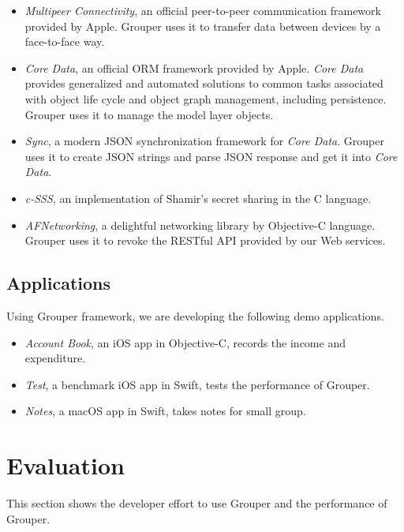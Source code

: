 \documentclass[twocolumn,10pt]{article}
\begin{document}
\begin{itemize}
	\setlength{\itemsep}{1pt}
	\setlength{\parskip}{0pt}
	\setlength{\parsep}{0pt}
	\item \emph{Multipeer Connectivity}\cite{mc},  an official peer-to-peer communication framework provided by Apple. Grouper uses it to transfer data between devices by a face-to-face way.
	\item \emph{Core Data}\cite{coredata}, an official ORM framework provided by Apple. \emph{Core Data} provides generalized and automated solutions to common tasks associated with object life cycle and object graph management, including persistence. Grouper uses it to manage the model layer objects. 
	\item \emph{Sync}\cite{sync}, a modern JSON synchronization framework for \emph{Core Data}. Grouper uses it to create JSON strings and parse JSON response and get it into \emph{Core Data}.
	\item \emph{c-SSS}\cite{c-sss}, an implementation of Shamir's secret sharing in the C language.
	\item \emph{AFNetworking}\cite{afnetworking}, a delightful networking library by Objective-C language. Grouper uses it to revoke the RESTful API provided by our Web services. 
\end{itemize}

\subsection{Applications}

Using Grouper framework, we are developing the following demo applications. 

\begin{itemize}
	\setlength{\itemsep}{1pt}
	\setlength{\parskip}{0pt}
	\setlength{\parsep}{0pt}
	\item \emph{Account Book}, an iOS app in Objective-C, records the income and expenditure.
	\item \emph{Test}, a benchmark iOS app in Swift, tests the performance of Grouper.
	\item \emph{Notes}, a macOS app in Swift, takes notes for small group.
\end{itemize}

\section{Evaluation}

This section shows the developer effort to use Grouper and the performance of Grouper.
\end{document}
